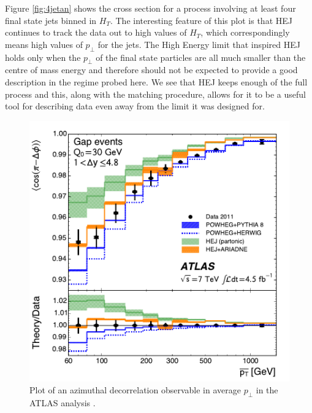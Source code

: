 Figure \ref{fig:4jetan} shows the cross section for a process involving at least four final state jets binned in $H_T$. The interesting feature of this plot is that HEJ continues to track the data out to high values of $H_T$, which correspondingly means high values of $p_\perp$ for the jets. The High Energy limit that inspired HEJ holds only when the $p_\perp$ of the final state particles are all much smaller than the centre of mass energy and therefore should not be expected to provide a good description in the regime probed here. We see that HEJ keeps enough of the full process and this, along with the matching procedure, allows for it to be a useful tool for describing data even away from the limit it was designed for. 



\begin{figure}[t]
\centering
\includegraphics[scale=0.8]{Images/hej_powheg_agree.pdf} 
\caption{Plot of an azimuthal decorrelation observable in average $p_\perp$ in the ATLAS analysis \cite{Aad2014}.}
\label{fig:vetoptbar}
\end{figure}

